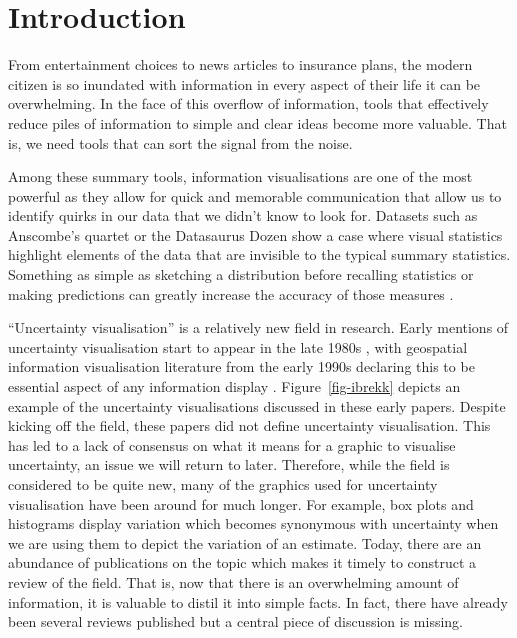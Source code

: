 \documentclass[
  12pt]{article}
\begin{document}
\newpage
{} %


\section{Introduction}\label{introduction}

From entertainment choices to news articles to insurance plans, the
modern citizen is so inundated with information in every aspect of their
life it can be overwhelming. In the face of this overflow of
information, tools that effectively reduce piles of information to
simple and clear ideas become more valuable. That is, we need tools that
can sort the signal from the noise.

Among these summary tools, information visualisations are one of the
most powerful as they allow for quick and memorable communication that
allow us to identify quirks in our data that we didn't know to look for.
Datasets such as Anscombe's quartet \citep{anscombe} or the Datasaurus
Dozen \citep{datasaurpkg} show a case where visual statistics highlight
elements of the data that are invisible to the typical summary
statistics. Something as simple as sketching a distribution before
recalling statistics or making predictions can greatly increase the
accuracy of those measures \citep{Hullman2018, Goldstein2014}.

``Uncertainty visualisation'' is a relatively new field in research.
Early mentions of uncertainty visualisation start to appear in the late
1980s \citep{Ibrekk1987}, with geospatial information visualisation
literature from the early 1990s declaring this to be essential aspect of
any information display \citep{MacEachren1992, Carr1992}.
Figure~\ref{fig-ibrekk} depicts an example of the uncertainty
visualisations discussed in these early papers. Despite kicking off the
field, these papers did not define uncertainty visualisation. This has
led to a lack of consensus on what it means for a graphic to visualise
uncertainty, an issue we will return to later. Therefore, while the
field is considered to be quite new, many of the graphics used for
uncertainty visualisation have been around for much longer. For example,
box plots and histograms display variation which becomes synonymous with
uncertainty when we are using them to depict the variation of an
estimate. Today, there are an abundance of publications on the topic
which makes it timely to construct a review of the field. That is, now
that there is an overwhelming amount of information, it is valuable to
distil it into simple facts. In fact, there have already been several
reviews published but a central piece of discussion is missing.
\end{document}
